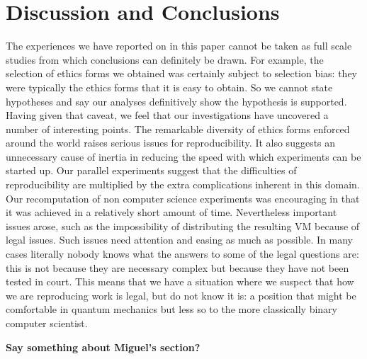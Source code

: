 \section{Discussion and Conclusions}
\label{s:discussion}

The experiences we have reported on in this paper cannot be taken as full scale studies from which conclusions can definitely be drawn.  For example, the 
selection of ethics forms we obtained was certainly subject to selection bias: they were typically the ethics forms that it is easy to obtain.  So we cannot state hypotheses and say our analyses definitively show the hypothesis is supported.   Having given that caveat, we feel that our investigations have uncovered a number of interesting points.  The remarkable diversity of ethics forms enforced around the world raises serious issues for reproducibility.  It also suggests an unnecessary cause of inertia in reducing the speed with which experiments can be started up.  Our parallel experiments suggest that the difficulties of reproducibility are 
multiplied by the extra complications inherent in this domain.  Our
recomputation of non computer science experiments was encouraging in
that it was achieved in a relatively short amount of time.
Nevertheless important issues arose, such as the impossibility of
distributing the resulting VM because of legal issues. 
Such issues need attention and easing as much as possible.  In many cases literally nobody knows what the answers to some of the legal questions are: this is not because they are necessary complex but because they have not been tested in court.  This means that we have a situation where we suspect that how we are reproducing work is legal, but do not know it is: a position that might be comfortable in quantum mechanics but less so to the more classically binary computer scientist. 

\textbf{Say something about Miguel's section?}



